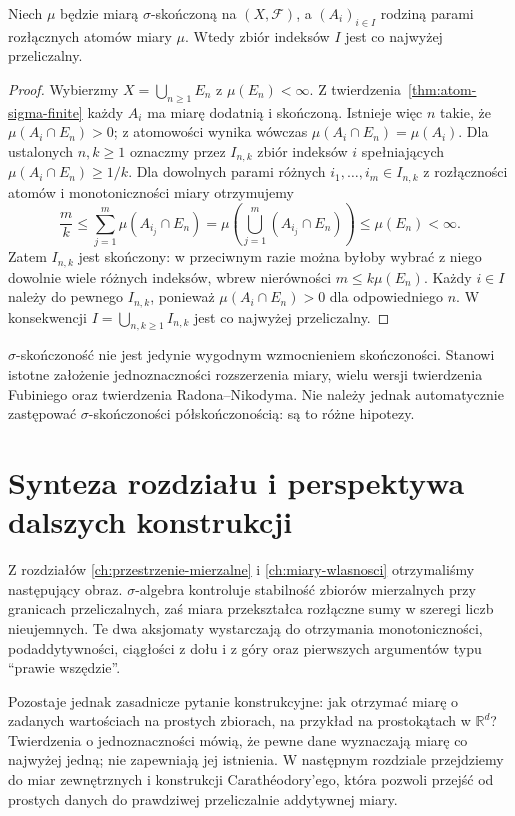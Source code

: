 \begin{wniosek}
\label{cor:countably-many-disjoint-atoms}
Niech $\mu$ będzie miarą $\sigma$-skończoną na
$(X,\mathcal F)$, a $(A_i)_{i\in I}$ rodziną parami rozłącznych
atomów miary $\mu$. Wtedy zbiór indeksów $I$ jest co najwyżej
przeliczalny.
\end{wniosek}
\begin{proof}
Wybierzmy $X=\bigcup_{n\ge1}E_n$ z $\mu(E_n)<\infty$.
Z twierdzenia~\ref{thm:atom-sigma-finite} każdy $A_i$ ma
miarę dodatnią i skończoną. Istnieje więc $n$ takie, że
$\mu(A_i\cap E_n)>0$; z atomowości wynika wówczas
$\mu(A_i\cap E_n)=\mu(A_i)$. Dla ustalonych $n,k\ge1$ oznaczmy przez $I_{n,k}$
zbiór indeksów $i$ spełniających
$\mu(A_i\cap E_n)\ge1/k$. Dla dowolnych parami różnych
$i_1,\ldots,i_m\in I_{n,k}$ z rozłączności atomów i
monotoniczności miary otrzymujemy
\[
\frac{m}{k}\leq
\sum_{j=1}^{m}\mu(A_{i_j}\cap E_n)
=\mu\!\left(\bigcup_{j=1}^{m}(A_{i_j}\cap E_n)\right)
\leq\mu(E_n)<\infty.
\]
Zatem $I_{n,k}$ jest skończony: w przeciwnym razie
można byłoby wybrać z niego dowolnie wiele różnych indeksów,
wbrew nierówności $m\leq k\mu(E_n)$.
Każdy $i\in I$ należy do pewnego $I_{n,k}$, ponieważ
$\mu(A_i\cap E_n)>0$ dla odpowiedniego $n$.
W konsekwencji $I=\bigcup_{n,k\ge1}I_{n,k}$
jest co najwyżej przeliczalny.
\end{proof}

\begin{uwaga}
$\sigma$-skończoność nie jest jedynie wygodnym
wzmocnieniem skończoności. Stanowi istotne założenie
jednoznaczności rozszerzenia miary, wielu wersji
twierdzenia Fubiniego oraz twierdzenia Radona--Nikodyma.
Nie należy jednak automatycznie zastępować
$\sigma$-skończoności półskończonością: są to różne hipotezy.
\end{uwaga}

\section{Synteza rozdziału i perspektywa dalszych konstrukcji}

Z rozdziałów \ref{ch:przestrzenie-mierzalne} i
\ref{ch:miary-wlasnosci} otrzymaliśmy następujący obraz.
$\sigma$-algebra kontroluje stabilność zbiorów mierzalnych
przy granicach przeliczalnych, zaś miara przekształca
rozłączne sumy w szeregi liczb nieujemnych. Te dwa
aksjomaty wystarczają do otrzymania monotoniczności,
podaddytywności, ciągłości z dołu i z góry oraz pierwszych
argumentów typu ``prawie wszędzie''.

Pozostaje jednak zasadnicze pytanie konstrukcyjne:
jak otrzymać miarę o zadanych wartościach na prostych
zbiorach, na przykład na prostokątach w $\mathbb R^d$?
Twierdzenia o jednoznaczności mówią, że pewne dane
wyznaczają miarę co najwyżej jedną; nie zapewniają
jej istnienia. W następnym rozdziale przejdziemy
do miar zewnętrznych i konstrukcji Carathéodory'ego,
która pozwoli przejść od prostych danych do prawdziwej
przeliczalnie addytywnej miary.

